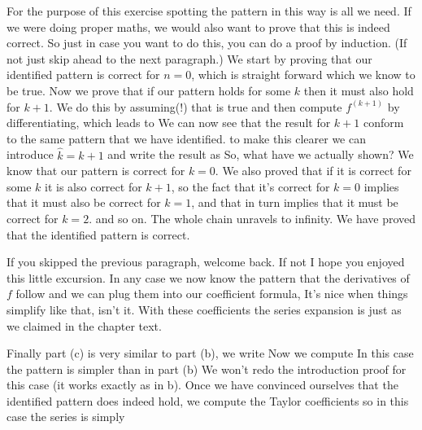 For the purpose of this exercise spotting the pattern in this way is all we need. If we were doing proper maths, we would also want to prove that this is indeed correct. So just in case you want to do this, you can do a proof by induction. (If not just skip ahead to the next paragraph.) We start by proving that our identified pattern is correct for $n=0$, which is straight forward
which we know to be true. Now we prove that if our pattern holds for some $k$ then it must also hold for $k+1$. We do this by assuming(!) that 
is true and then compute $f^{(k+1)}$ by differentiating, which leads to 
We can now see that the result for $k+1$ conform to the same pattern that we have identified. to make this clearer we can introduce $\hat{k}=k+1$ and write the result as 
So, what have we actually shown? We know that our pattern is correct for $k=0$. We also proved that if it is correct for some $k$ it is also correct for $k+1$, so the fact that it's correct for $k=0$ implies that it must also be correct for $k=1$, and that in turn implies that it must be correct for $k=2$. and so on. The whole chain unravels to infinity. We have proved that the identified pattern is correct. 

If you skipped the previous paragraph, welcome back. If not I hope you enjoyed this little excursion. In any case we now know the pattern that the derivatives of $f$ follow and we can plug them into our coefficient formula,
It's nice when things simplify like that, isn't it. With these coefficients the series expansion is just 
as we claimed in the chapter text.

Finally part (c) is very similar to part (b), we write 
Now we compute 
In this case the pattern is simpler than in part (b) 
We won't redo the introduction proof for this case (it works exactly as in b). Once we have convinced ourselves that the identified pattern does indeed hold, we compute the Taylor coefficients 
so in this case the series is simply
